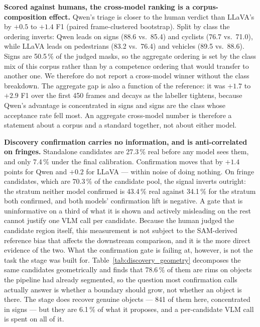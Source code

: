 \documentclass[conference]{IEEEtran}
\begin{document}
\textbf{Scored against humans, the cross-model ranking is a corpus-composition effect.}
Qwen's triage is closer to the human verdict than LLaVA's by $+0.5$ to $+1.4$ F1 (paired
frame-clustered bootstrap). Split by class the ordering inverts: Qwen leads on signs
(88.6 vs.\ 85.4) and cyclists (76.7 vs.\ 71.0), while LLaVA leads on
pedestrians (83.2 vs.\ 76.4) and vehicles (89.5 vs.\ 88.6).
Signs are 50.5\,\% of the judged masks, so the aggregate ordering is set by the class mix of
this corpus rather than by a competence ordering that would transfer to another one. We therefore do
not report a cross-model winner without the class breakdown.
The aggregate gap is also a function of the reference: it was $+1.7$ to $+2.9$ F1 over the first 450
frames and decays as the labeller tightens, because Qwen's advantage is concentrated in signs and
signs are the class whose acceptance rate fell most. An aggregate cross-model number is therefore a
statement about a corpus and a standard together, not about either model.

\textbf{Discovery confirmation carries no information, and is anti-correlated on fringes.}
Standalone candidates are 27.3\,\% real before any model sees them, and only 7.4\,\% under the final
calibration. Confirmation moves that by $+1.4$ points for Qwen and $+0.2$ for LLaVA --- within noise of
doing nothing. On fringe candidates, which are 70.3\,\% of the candidate pool, the signal inverts
outright: the stratum neither model confirmed is 43.4\,\% real against 34.1\,\% for the stratum both
confirmed, and both models' confirmation lift is negative. A gate that is uninformative on a third of
what it is shown and actively misleading on the rest cannot justify one VLM call per candidate.
Because the human judged the candidate region itself, this measurement is not subject to the
SAM-derived reference bias that affects the downstream comparison, and it is the more direct evidence
of the two.
What the confirmation gate is failing at, however, is not the task the stage was built for.
Table~\ref{tab:discovery_geometry} decomposes the same candidates geometrically and finds that
78.6\,\% of them are rims on objects the pipeline had already segmented, so the question most
confirmation calls actually answer is whether a boundary should grow, not whether an object is there.
The stage does recover genuine objects --- 841 of them here, concentrated in signs --- but they are
6.1\,\% of what it proposes, and a per-candidate VLM call is spent on all of it.


\end{document}
